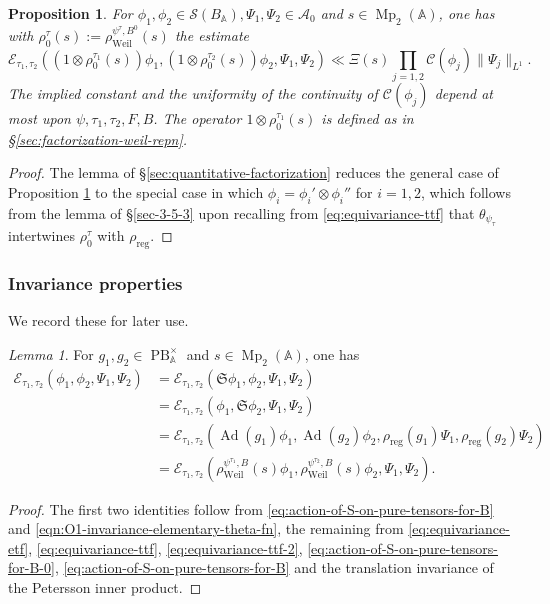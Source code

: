 \documentclass[reqno,10pt]{amsart}
\theoremstyle{plain} %
\theoremstyle{definition}
\theoremstyle{plain} %
\newtheorem{proposition} {Proposition}
\theoremstyle{remark}
\theoremstyle{itplain} %
\newtheorem*{lemma*}{Lemma}
\theoremstyle{remark} %
\numberwithin{equation}{section}
\DeclareMathOperator{\Mp}{Mp}
\DeclareMathOperator{\Ad}{Ad}
\def\PB{\operatorname{PB}}
\def\Sob{\mathcal{C}}
\DeclareMathOperator{\Weil}{Weil}
\DeclareMathOperator{\reg}{reg}
\begin{document}
\begin{proposition}\label{prop:main-error-estimate-global-adelic-general}
  For $\phi_1, \phi_2 \in \mathcal{S}(B_\mathbb{A}), \Psi_1,\Psi_2 \in \mathcal{A}_0$ and $s \in \Mp_2(\mathbb{A})$, one has with $\rho_0^{\tau}(s) := \rho_{\Weil}^{\psi^{\tau}, B^0}(s)$ the estimate
  \begin{equation}
    \mathcal{E}_{\tau_1,\tau_2}((1 \otimes \rho_0^{\tau_1}(s))\phi_1,
    (1 \otimes \rho_0^{\tau_2}(s))\phi_2,
    \Psi_1,\Psi_2)
    \ll \Xi(s)
    \prod_{j=1,2}
    \Sob(\phi_j)
    \|\Psi_j\|_{L^1}.
  \end{equation}
  The implied constant and the uniformity of the continuity of $\Sob(\phi_j)$
  depend at most upon $\psi,\tau_1,\tau_2,F,B$.  The operator $1 \otimes \rho_0^{\tau_1}(s)$ is defined as in \S\ref{sec:factorization-weil-repn}.
\end{proposition}
\begin{proof}
  The lemma of \S\ref{sec:quantitative-factorization} reduces the general case of Proposition \ref{prop:main-error-estimate-global-adelic-general} to the special case in which $\phi_i = \phi_i' \otimes \phi_i''$ for $i=1,2$, which follows from the lemma of \S\ref{sec-3-5-3} upon recalling from \eqref{eq:equivariance-ttf} that $\theta_{\psi_\tau}$ intertwines $\rho_{0}^{\tau}$ with $\rho_{\reg}$.
\end{proof}

\subsubsection{Invariance properties}\label{sec:equivariance-summary-for-E-tau-tau}
We record these for later use.
\begin{lemma*}\label{lem:equivariance-summary-for-E-tau-tau}
  For $g_1, g_2 \in \PB^\times_\mathbb{A}$ and $s \in \Mp_2(\mathbb{A})$, one has
  \begin{align*}
    \mathcal{E}_{\tau_1,\tau_2}(\phi_1, \phi_2, \Psi_1, \Psi_2)
    &=
      \mathcal{E}_{\tau_1,\tau_2}(\mathfrak{S} \phi_1, \phi_2,
      \Psi_1, \Psi_2)
    \\
    &=
      \mathcal{E}_{\tau_1,\tau_2}(\phi_1, \mathfrak{S} \phi_2,
      \Psi_1, \Psi_2)
    \\
    &=
      \mathcal{E}_{\tau_1,\tau_2}(\Ad(g_1) \phi_1, \Ad(g_2) \phi_2,
      \rho_{\reg}(g_1) \Psi_1,       \rho_{\reg}(g_2)\Psi_2)
    \\
    &=
      \mathcal{E}_{\tau_1,\tau_2}(\rho_{\Weil}^{\psi^{\tau_1},B}(s) \phi_1, \rho_{\Weil}^{\psi^{\tau_2},B}(s) \phi_2,
      \Psi_1, \Psi_2).
  \end{align*}
\end{lemma*}
\begin{proof}
  The first two identities follow from \eqref{eq:action-of-S-on-pure-tensors-for-B} and \eqref{eqn:O1-invariance-elementary-theta-fn}, the remaining from \eqref{eq:equivariance-etf}, \eqref{eq:equivariance-ttf}, \eqref{eq:equivariance-ttf-2}, \eqref{eq:action-of-S-on-pure-tensors-for-B-0}, \eqref{eq:action-of-S-on-pure-tensors-for-B} and the translation invariance of the Petersson inner product.
\end{proof}
\end{document}
